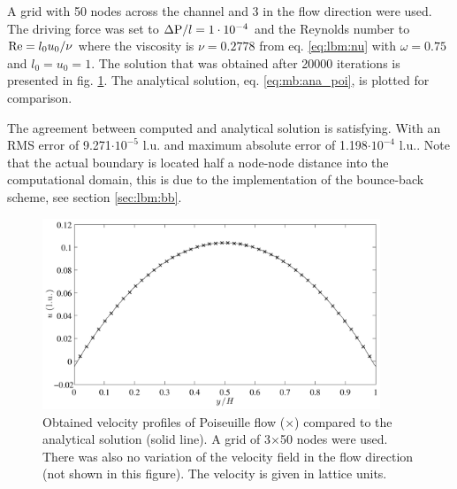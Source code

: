 A grid with 50 nodes across the channel and 3 in the flow direction
were used. The driving force was set to $\Delta \mathrm{P} / l = 1\cdot 10^{-4}$ and
the Reynolds number to $\mathrm{Re} = l_0 u_0/\nu$ where the viscosity
is $\nu = 0.2778$ from eq. \eqref{eq:lbm:nu} with $\omega = 0.75$ and
$l_0 = u_0 = 1$. The solution that was obtained after 20000
iterations is presented in fig. \ref{fig:mb:poi}. The analytical
solution, eq. \eqref{eq:mb:ana_poi}, is plotted for comparison.

The agreement between computed and analytical solution is
satisfying. With an RMS error of 9.271$\cdot 10^{-5}$ l.u. and maximum
absolute error of 1.198$\cdot10^{-4}$ l.u.. Note that the actual boundary
is located half a node-node distance into the computational domain,
this is due to the implementation of the bounce-back scheme, see
section \ref{sec:lbm:bb}.  

\begin{figure}
\begin{center}
\includegraphics[width=0.9\textwidth]{fig/poiseuille.pdf}
\end{center}
\caption{Obtained velocity profiles of Poiseuille flow ($\times$)
  compared to the analytical solution (solid line). A grid of
  3$\times$50 nodes were used. There was also no variation of the
  velocity field in the flow direction (not shown in this
  figure). The velocity is given in lattice units.}
\label{fig:mb:poi}
\end{figure}

